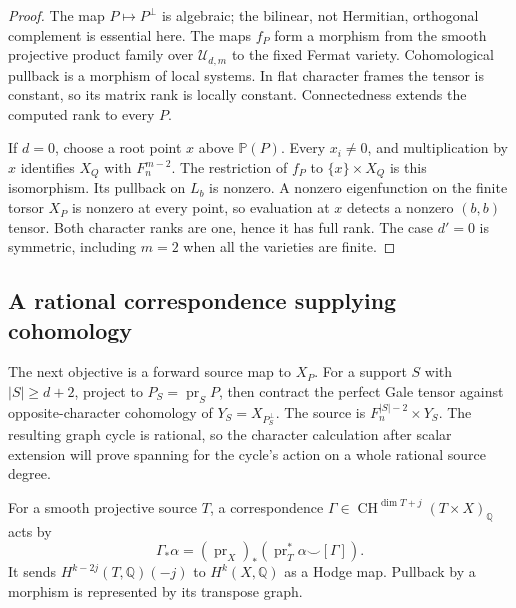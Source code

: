 \documentclass[11pt]{article}
\newcommand{\Q}{\mathbb Q}
\newcommand{\PP}{\mathbb P}
\newcommand{\CH}{\operatorname{CH}}
\newcommand{\pr}{\operatorname{pr}}
\newcommand{\U}{\mathcal U}
\theoremstyle{plain}
\theoremstyle{definition}
\theoremstyle{remark}
\numberwithin{equation}{section}
\begin{document}
\begin{proof}
The map \(P\mapsto P^\perp\) is algebraic; the bilinear, not
Hermitian, orthogonal complement is essential here.  The maps
\(f_P\) form a morphism from the smooth projective product family
over \(\U_{d,m}\) to the fixed Fermat variety.  Cohomological
pullback is a morphism of local systems.  In flat character frames
the tensor is constant, so its matrix rank is locally constant.
Connectedness extends the computed rank to every \(P\).

If \(d=0\), choose a root point \(x\) above \(\PP(P)\).
Every \(x_i\ne0\), and multiplication by \(x\) identifies
\(X_Q\) with \(F_n^{m-2}\).  The restriction of \(f_P\) to
\(\{x\}\times X_Q\) is this isomorphism.  Its pullback on \(L_b\)
is nonzero.  A nonzero eigenfunction on the finite torsor \(X_P\)
is nonzero at every point, so evaluation at \(x\) detects a nonzero
\((b,b)\) tensor.  Both character ranks are one, hence it has
full rank.  The case \(d'=0\) is symmetric, including \(m=2\)
when all the varieties are finite.
\end{proof}

\subsection{A rational correspondence supplying cohomology}
The next objective is a forward source map to \(X_P\).  For a
support \(S\) with \(|S|\geq d+2\), project to \(P_S=\pr_S P\), then contract the
perfect Gale tensor against opposite-character cohomology of
\(Y_S=X_{P_S^\perp}\).  The source is \(F_n^{|S|-2}\times Y_S\).
The resulting graph cycle is rational, so the character calculation
after scalar extension will prove spanning for the cycle's action on
a whole rational source degree.

For a smooth projective source \(T\), a correspondence
\(\Gamma\in\CH^{\dim T+j}(T\times X)_\Q\) acts by
\[
 \Gamma_*\alpha=(\pr_X)_*(\pr_T^*\alpha\smile[\Gamma]).
\]
It sends \(H^{k-2j}(T,\Q)(-j)\) to \(H^k(X,\Q)\) as a Hodge
map.  Pullback by a morphism is represented by its transpose graph.
\end{document}
